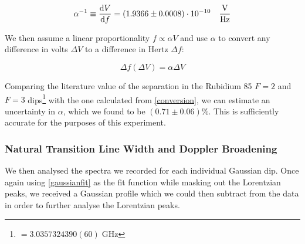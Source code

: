 \documentclass[12pt, a4paper]{article}
\begin{document}
\begin{equation}
\alpha^{-1} \equiv \dv{V}{f} = (1.9366 \pm 0.0008) \cdot 10^{-10} \quad \si{\frac{\volt}{\hertz}}
\end{equation}

We then assume a linear proportionality $f \propto \alpha V$ and use $\alpha$ to convert any difference in volts $\Delta V$ to a difference in Hertz $\Delta f$:

\begin{equation}
\Delta f (\Delta V) = \alpha \Delta V
\label{conversion}
\end{equation}

Comparing the literature value of the separation in the Rubidium 85 $F = 2$ and $F = 3$ dips\footnote{$=3.0357324390(60) \;\si{\giga\hertz}$\cite{script}} with the one calculated from \autoref{conversion}, we can estimate an uncertainty in $\alpha$, which we found to be $(0.71 \pm 0.06) \%$. This is sufficiently accurate for the purposes of this experiment.

\subsubsection{Natural Transition Line Width and Doppler Broadening}

We then analysed the spectra we recorded for each individual Gaussian dip. Once again using \autoref{gaussianfit} as the fit function while masking out the Lorentzian peaks, we received a Gaussian profile which we could then subtract from the data in order to further analyse the Lorentzian peaks.
\end{document}
